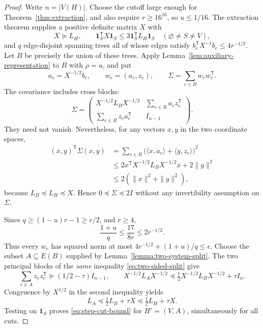 \documentclass[11pt]{amsart}
\theoremstyle{definition}
\theoremstyle{remark}
\numberwithin{equation}{section}
\begin{document}
\begin{proof}
Write $n=|V(H)|$. Choose the cutoff large enough for
Theorem~\ref{thm:extraction}, and
also require $r\geq16^{16}$, so $u\leq1/16$.
The extraction theorem supplies a positive definite matrix $X$ with
\[
 X\succeq L_H,
 \qquad
 \mathbf1_S^{\mathsf T}X\mathbf1_S
 \leq3\mathbf1_S^{\mathsf T}L_H\mathbf1_S
 \quad(\varnothing\ne S\ne V),
\]
and $q$ edge-disjoint spanning trees all of whose edges satisfy
$b_e^{\mathsf T}X^{-1}b_e\leq4r^{-1/2}$.
Let $B$ be precisely the union of these trees.  Apply
Lemma~\ref{lem:auxiliary-representation} to $B$ with $\rho=u$, and put
\[
 a_e=X^{-1/2}b_e,\qquad w_e=(a_e,z_e),
 \qquad\Sigma=\sum_{e\in B}w_ew_e^{\mathsf T}.
\]
The covariance includes cross blocks:
\[
 \Sigma=\begin{pmatrix}
 X^{-1/2}L_BX^{-1/2}&\displaystyle\sum_{e\in B}a_ez_e^{\mathsf T}\\
 \displaystyle\sum_{e\in B}z_ea_e^{\mathsf T}&I_{n-1}
 \end{pmatrix}.
\]
They need not vanish.  Nevertheless, for any vectors $x,y$ in the two
coordinate spaces,
\begin{align*}
 (x,y)^{\mathsf T}\Sigma(x,y)
 &=\sum_{e\in B}\bigl(\langle x,a_e\rangle+
                          \langle y,z_e\rangle\bigr)^2\\
 &\leq2x^{\mathsf T}X^{-1/2}L_BX^{-1/2}x+2\|y\|^2\\
 &\leq2(\|x\|^2+\|y\|^2),
\end{align*}
because $L_B\preceq L_H\preceq X$.  Hence
$0\preceq\Sigma\preceq2I$ without any invertibility assumption on
$\Sigma$.

Since $q\geq(1-u)r-1\geq r/2$, and $r\geq4$,
\[
 \frac{1+u}{q}\leq\frac{17}{8r}\leq2r^{-1/2}.
\]
Thus every $w_e$ has squared norm at most
$4r^{-1/2}+(1+u)/q\leq\epsilon$.
Choose the subset $A\subseteq E(B)$ supplied by
Lemma~\ref{lemma:two-system-split}.  The two principal blocks of the
\emph{same} inequality \eqref{eq:two-sided-split} give
\begin{equation}
 \sum_{e\in A}z_ez_e^{\mathsf T}\succeq(1/2-\tau)I_{n-1},
 \qquad
 X^{-1/2}L_AX^{-1/2}
 \preceq\tfrac12X^{-1/2}L_BX^{-1/2}+\tau I_n.
 \label{eq:same-subset-two-constraints}
\end{equation}
Congruence by $X^{1/2}$ in the second inequality yields
\[
 L_A\preceq\tfrac12L_B+\tau X
       \preceq\tfrac12L_H+\tau X.
\]
Testing on $\mathbf1_S$ proves \eqref{eq:step-cut-bound} for
$H'=(V,A)$, simultaneously for all cuts.


\end{proof}
\end{document}

